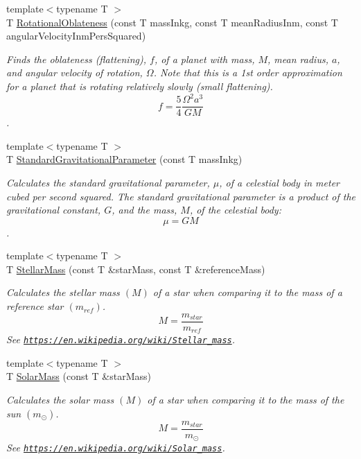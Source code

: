 \begin{DoxyCompactItemize}
{\footnotesize template$<$typename T $>$ }\\T \mbox{\hyperlink{group___e_g_x_phys-_astrophysics-_rotational_flattening_ga7d78d01c8b3e1a9b2e4f17cb67969a88}{Rotational\+Oblateness}} (const T mass\+Inkg, const T mean\+Radius\+Inm, const T angular\+Velocity\+Inm\+Pers\+Squared)
\begin{DoxyCompactList}\small\item\em Finds the oblateness (flattening), $f$, of a planet with mass, $M$, mean radius, $a$, and angular velocity of rotation, $\Omega$. Note that this is a 1st order approximation for a planet that is rotating relatively slowly (small flattening). \[ f = \frac{5}{4} \frac{\Omega^2 a^3}{GM} \]. \end{DoxyCompactList}\item 
{\footnotesize template$<$typename T $>$ }\\T \mbox{\hyperlink{group___e_g_x_phys-_astrophysics-_standard_gravitational_parameter_ga37f4ed78b0fc23603b49ade3e435ea20}{Standard\+Gravitational\+Parameter}} (const T mass\+Inkg)
\begin{DoxyCompactList}\small\item\em Calculates the standard gravitational parameter, $\mu$, of a celestial body in meter cubed per second squared. The standard gravitational parameter is a product of the gravitational constant, $G$, and the mass, $M$, of the celestial body\+: \[\mu = GM\]. \end{DoxyCompactList}\item 
{\footnotesize template$<$typename T $>$ }\\T \mbox{\hyperlink{group___e_g_x_phys-_stellar_mass_gabbd6081cd3bfb0153d7470d58f733a61}{Stellar\+Mass}} (const T \&star\+Mass, const T \&reference\+Mass)
\begin{DoxyCompactList}\small\item\em Calculates the stellar mass $(M)$ of a star when comparing it to the mass of a reference star $(m_{ref})$. \[M=\frac{m_{star}}{m_{ref}}\] See \href{https://en.wikipedia.org/wiki/Stellar_mass}{\tt https\+://en.\+wikipedia.\+org/wiki/\+Stellar\+\_\+mass}. \end{DoxyCompactList}\item 
{\footnotesize template$<$typename T $>$ }\\T \mbox{\hyperlink{group___e_g_x_phys-_stellar_mass_gac393d64d586be3dc76ac7a98ac336514}{Solar\+Mass}} (const T \&star\+Mass)
\begin{DoxyCompactList}\small\item\em Calculates the solar mass $(M)$ of a star when comparing it to the mass of the sun $(m_\odot)$. \[M=\frac{m_{star}}{m_\odot}\] See \href{https://en.wikipedia.org/wiki/Solar_mass}{\tt https\+://en.\+wikipedia.\+org/wiki/\+Solar\+\_\+mass}. \end{DoxyCompactList}\item 

\end{DoxyCompactItemize}
